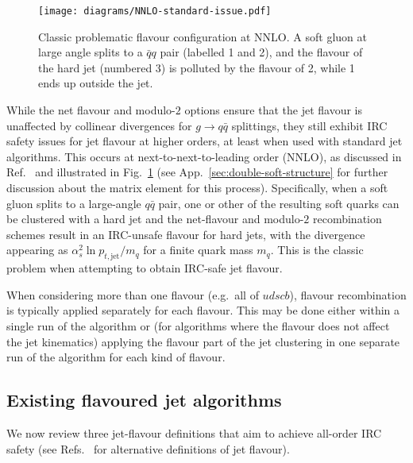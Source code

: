 \documentclass[nofootinbib,twocolumn,preprintnumbers,superscriptaddress,aps]{revtex4-2}
\newcommand{\as}{\alpha_s}
\newcommand{\jet}{\text{jet}}
\begin{document}
\begin{figure}
  \centering
  \texttt{[image: diagrams/NNLO-standard-issue.pdf]}
  \caption{Classic problematic flavour configuration at NNLO.
  A soft gluon at large angle splits to a $\bar q q$ pair (labelled 1 and 2),
  and the flavour of the hard jet (numbered 3) is polluted by the flavour
  of 2, while 1 ends up outside the jet.
  }
  \label{fig:classic-config}
\end{figure}


While the net flavour and modulo-$2$ options ensure that the jet
flavour is unaffected by collinear divergences for $g \to q\bar q$
splittings, they still exhibit IRC safety issues for jet flavour at
higher orders, at least when used with standard jet algorithms.
%
This occurs at next-to-next-to-leading order (NNLO), as discussed in Ref.~\cite{Banfi:2006hf} and illustrated
in Fig.~\ref{fig:classic-config}
(see App.~\ref{sec:double-soft-structure} for further discussion about the matrix element for this process).
%
Specifically, when a soft gluon splits to a large-angle $q\bar q$
pair, one or other of the resulting soft quarks can be 
clustered with a hard jet and the net-flavour and modulo-$2$
recombination schemes result in an IRC-unsafe flavour for hard
jets, with the divergence appearing as $\as^2 \ln p_{t,\jet}/m_q$ for a
finite quark mass $m_q$.
%
This is the classic problem when attempting to obtain IRC-safe jet
flavour.

When considering more than one flavour (e.g.\ all of $udscb$),
flavour recombination is typically applied separately for each
flavour. This may be done either within a single run of the algorithm or (for
algorithms where the flavour does not affect the jet kinematics)
applying the flavour part of the jet clustering in one separate run
of the algorithm for each kind of flavour.


\subsection{Existing flavoured jet algorithms}

We now review three jet-flavour definitions that aim to achieve all-order IRC safety
%
(see Refs.~\cite{Buckley:2015gua,Caletti:2022hnc,Caletti:2022glq} for alternative definitions of jet flavour).
\end{document}
